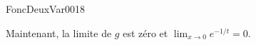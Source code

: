 \begin{corrige}{FoncDeuxVar0018}
\begin{enumerate}
			Maintenant, la limite de $g$ est zéro et $\lim_{x\to 0} e^{-1/t}=0$.

	\end{enumerate}

\end{corrige}
